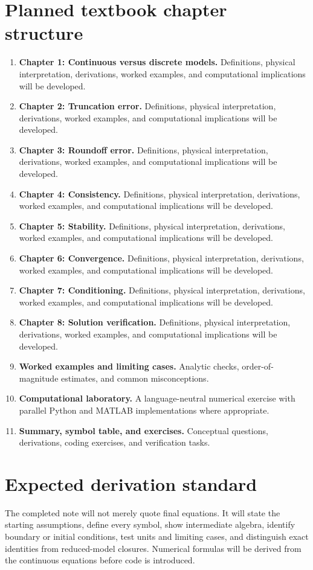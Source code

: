 \documentclass[11pt]{article}
\begin{document}
\section{Planned textbook chapter structure}
\begin{enumerate}[leftmargin=1.8em]
\item \textbf{Chapter 1: Continuous versus discrete models.} Definitions, physical interpretation, derivations, worked examples, and computational implications will be developed.
\item \textbf{Chapter 2: Truncation error.} Definitions, physical interpretation, derivations, worked examples, and computational implications will be developed.
\item \textbf{Chapter 3: Roundoff error.} Definitions, physical interpretation, derivations, worked examples, and computational implications will be developed.
\item \textbf{Chapter 4: Consistency.} Definitions, physical interpretation, derivations, worked examples, and computational implications will be developed.
\item \textbf{Chapter 5: Stability.} Definitions, physical interpretation, derivations, worked examples, and computational implications will be developed.
\item \textbf{Chapter 6: Convergence.} Definitions, physical interpretation, derivations, worked examples, and computational implications will be developed.
\item \textbf{Chapter 7: Conditioning.} Definitions, physical interpretation, derivations, worked examples, and computational implications will be developed.
\item \textbf{Chapter 8: Solution verification.} Definitions, physical interpretation, derivations, worked examples, and computational implications will be developed.
\item \textbf{Worked examples and limiting cases.} Analytic checks, order-of-magnitude estimates, and common misconceptions.
\item \textbf{Computational laboratory.} A language-neutral numerical exercise with parallel Python and MATLAB implementations where appropriate.
\item \textbf{Summary, symbol table, and exercises.} Conceptual questions, derivations, coding exercises, and verification tasks.
\end{enumerate}

\section{Expected derivation standard}
The completed note will not merely quote final equations. It will state the starting assumptions, define every symbol, show intermediate algebra, identify boundary or initial conditions, test units and limiting cases, and distinguish exact identities from reduced-model closures. Numerical formulas will be derived from the continuous equations before code is introduced.
\end{document}

